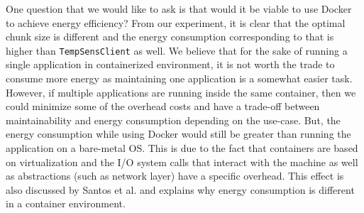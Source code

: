 One question that we would like to ask is that would it be viable to use Docker to achieve energy efficiency? From 
our experiment, it is clear that the optimal chunk size is different and the energy consumption corresponding 
to that is higher than \texttt{TempSensClient} as well. We believe that for the sake of running a single application 
in containerized environment, it is not worth the trade to consume more energy as maintaining one application is 
a somewhat easier task. However, if multiple applications are running inside the same container, then we 
could minimize some of the overhead costs and have a trade-off between maintainability and energy consumption 
depending on the use-case. But, the energy consumption while using Docker would still be greater than running the 
application on a bare-metal OS. This is due to the fact that containers are based on virtualization 
and the I/O system calls that interact with the machine as well as abstractions (such as network layer) 
have a specific overhead. This effect is also discussed by Santos et al. \cite{DBLP:journals/corr/abs-1011-0686} and explains why energy consumption 
is different in a container environment. 

